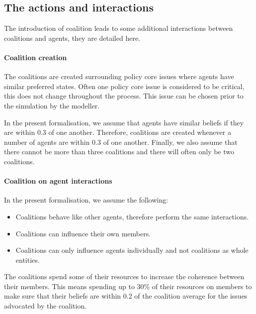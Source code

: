 \documentclass[11pt]{article}
\begin{document}
\subsection{The actions and interactions}


The introduction of coalition leads to some additional interactions between coalitions and agents, they are detailed here.

\paragraph{Coalition creation}

The coalitions are created surrounding policy core issues where agents have similar preferred states. Often one policy core issue is considered to be critical, this does not change throughout the process. This issue can be chosen prior to the simulation by the modeller.

In the present formalisation, we assume that agents have similar beliefs if they are within 0.3 of one another. Therefore, coalitions are created whenever a number of agents are within 0.3 of one another. Finally, we also assume that there cannot be more than three coalitions and there will often only be two coalitions.


\paragraph{Coalition on agent interactions}

In the present formalisation, we assume the following:

\begin{itemize}
\item Coalitions behave like other agents, therefore perform the same interactions.
\item Coalitions can influence their own members.
\item Coalitions can only influence agents individually and not coalitions as whole entities.
\end{itemize}

The coalitions spend some of their resources to increase the coherence between their members. This means spending up to 30\% of their resources on members to make sure that their beliefs are within 0.2 of the coalition average for the issues advocated by the coalition.
\end{document}

